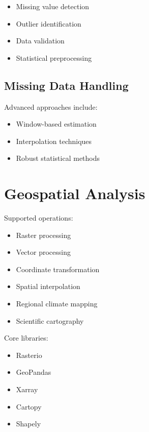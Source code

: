 \documentclass[11pt,a4paper]{article}
\begin{document}
\begin{itemize}

\item Missing value detection
\item Outlier identification
\item Data validation
\item Statistical preprocessing

\end{itemize}



\subsection{Missing Data Handling}


Advanced approaches include:


\begin{itemize}

\item Window-based estimation
\item Interpolation techniques
\item Robust statistical methods

\end{itemize}



\section{Geospatial Analysis}


Supported operations:


\begin{itemize}

\item Raster processing
\item Vector processing
\item Coordinate transformation
\item Spatial interpolation
\item Regional climate mapping
\item Scientific cartography

\end{itemize}


Core libraries:


\begin{itemize}

\item Rasterio
\item GeoPandas
\item Xarray
\item Cartopy
\item Shapely

\end{itemize}
\end{document}
